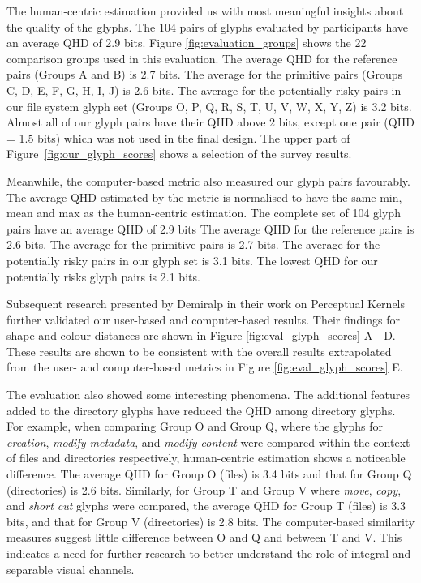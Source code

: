 The human-centric estimation provided us with most meaningful insights about the quality of the glyphs.
The 104 pairs of glyphs evaluated by participants have an average QHD of 2.9 bits.
Figure \ref{fig:evaluation_groups} shows the 22 comparison groups used in this evaluation. 
The average QHD for the reference pairs (Groups A and B) is 2.7 bits.
The average for the primitive pairs (Groups C, D, E, F, G, H, I, J) is 2.6 bits.
The average for the potentially risky pairs in our file system glyph set (Groups O, P, Q, R, S, T, U, V, W, X, Y, Z) is 3.2 bits.
Almost all of our glyph pairs have their QHD above 2 bits, except one pair (QHD = 1.5 bits) which was not used in the final design.
The upper part of Figure~\ref{fig:our_glyph_scores} shows a selection of the survey results.

Meanwhile, the computer-based metric also measured our glyph pairs favourably.
The average QHD estimated by the metric is normalised to have the same min, mean and max as the human-centric estimation.
The complete set of 104 glyph pairs have an average QHD of 2.9 bits
The average QHD for the reference pairs is 2.6 bits.
The average for the primitive pairs is 2.7 bits.
The average for the potentially risky pairs in our glyph set is 3.1 bits.
The lowest QHD for our potentially risks glyph pairs is 2.1 bits.


Subsequent research presented by Demiralp \etal in their work on Perceptual Kernels\cite{demiralplearning} further validated our user-based and computer-based results.
Their findings for shape and colour distances are shown in Figure \ref{fig:eval_glyph_scores} A - D.
These results are shown to be consistent with the overall results extrapolated from the user- and computer-based metrics in Figure \ref{fig:eval_glyph_scores} E. 

The evaluation also showed some interesting phenomena.
The additional features added to the directory glyphs have reduced the QHD among directory glyphs.
For example, when comparing Group O and Group Q, where the glyphs for \emph{creation}, \emph{modify metadata}, and \emph{modify content} were compared within the context of files and directories respectively, human-centric estimation shows a noticeable difference.
The average QHD for Group O (files) is 3.4 bits and that for Group Q (directories) is 2.6 bits.
Similarly, for Group T and Group V where \emph{move}, \emph{copy}, and \emph{short cut} glyphs were compared, the average QHD for Group T (files) is 3.3 bits, and that for Group V (directories) is 2.8 bits.
The computer-based similarity measures suggest little difference between O and Q and between T and V.
This indicates a need for further research to better understand the role of integral and separable visual channels.

